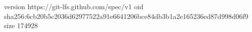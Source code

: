 version https://git-lfs.github.com/spec/v1
oid sha256:6cb20b5c2036d62977522a91e6641206bce84db3b1a2e165236ed87d998d06f9
size 174928
